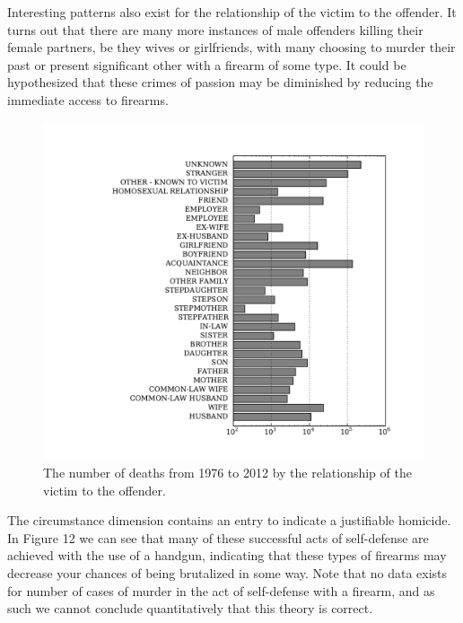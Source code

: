 \begin{multicols}{2}
Interesting patterns also exist for the relationship of the victim to the offender.  It turns out that there are many more instances of male offenders killing their female partners, be they wives or girlfriends, with many choosing to murder their past or present significant other with a firearm of some type.  It could be hypothesized that these crimes of passion may be diminished by reducing the immediate access to firearms.

\begin{figure}[H]
  \centering
    \includegraphics[width=1.0\linewidth]{images/relationship.pdf}
  \caption{The number of deaths from 1976 to 2012 by the relationship of the victim to the offender.}
\end{figure}

The circumstance dimension contains an entry to indicate a justifiable homicide.  In Figure 12 we can see that many of these successful acts of self-defense are achieved with the use of a handgun, indicating that these types of firearms may decrease your chances of being brutalized in some way.  Note that no data exists for number of cases of murder in the act of self-defense with a firearm, and as such we cannot conclude quantitatively that this theory is correct.


\end{multicols}
